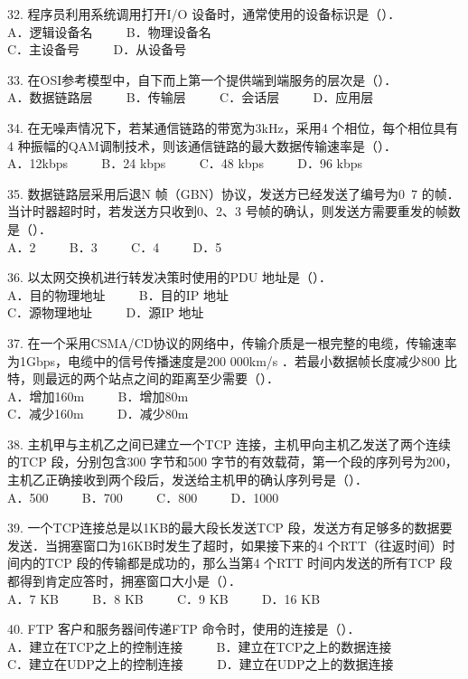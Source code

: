 32. 程序员利用系统调用打开I/O 设备时，通常使用的设备标识是（）． \\
A．逻辑设备名 $\qquad$ B．物理设备名 \\
C．主设备号 $\qquad$ D．从设备号

33. 在OSI参考模型中，自下而上第一个提供端到端服务的层次是（）． \\
A．数据链路层 $\qquad$ B．传输层 $\qquad$ C．会话层 $\qquad$ D．应用层

34. 在无噪声情况下，若某通信链路的带宽为3kHz，采用4 个相位，每个相位具有4 种振幅的QAM调制技术，则该通信链路的最大数据传输速率是（）． \\
A．12kbps $\qquad$ B．24 kbps $\qquad$ C．48 kbps $\qquad$ D．96 kbps

35. 数据链路层采用后退N 帧（GBN）协议，发送方已经发送了编号为0~7 的帧．当计时器超时时，若发送方只收到0、2、3 号帧的确认，则发送方需要重发的帧数是（）． \\
A．2 $\qquad$ B．3 $\qquad$ C．4 $\qquad$ D．5

36. 以太网交换机进行转发决策时使用的PDU 地址是（）． \\
A．目的物理地址 $\qquad$ B．目的IP 地址 \\
C．源物理地址 $\qquad$ D．源IP 地址

37. 在一个采用CSMA/CD协议的网络中，传输介质是一根完整的电缆，传输速率为1Gbps，电缆中的信号传播速度是200 000km/s ．若最小数据帧长度减少800 比特，则最远的两个站点之间的距离至少需要（）． \\
A．增加160m $\qquad$ B．增加80m \\
C．减少160m $\qquad$ D．减少80m

38. 主机甲与主机乙之间已建立一个TCP 连接，主机甲向主机乙发送了两个连续的TCP 段，分别包含300 字节和500 字节的有效载荷，第一个段的序列号为200，主机乙正确接收到两个段后，发送给主机甲的确认序列号是（）． \\
A．500 $\qquad$ B．700 $\qquad$ C．800 $\qquad$ D．1000

39. 一个TCP连接总是以1KB的最大段长发送TCP 段，发送方有足够多的数据要发送．当拥塞窗口为16KB时发生了超时，如果接下来的4 个RTT（往返时间）时间内的TCP 段的传输都是成功的，那么当第4 个RTT 时间内发送的所有TCP 段都得到肯定应答时，拥塞窗口大小是（）． \\
A．7 KB $\qquad$ B．8 KB $\qquad$ C．9 KB $\qquad$ D．16 KB

40. FTP 客户和服务器间传递FTP 命令时，使用的连接是（）． \\
A．建立在TCP之上的控制连接 $\qquad$ B．建立在TCP之上的数据连接 \\
C．建立在UDP之上的控制连接 $\qquad$ D．建立在UDP之上的数据连接

